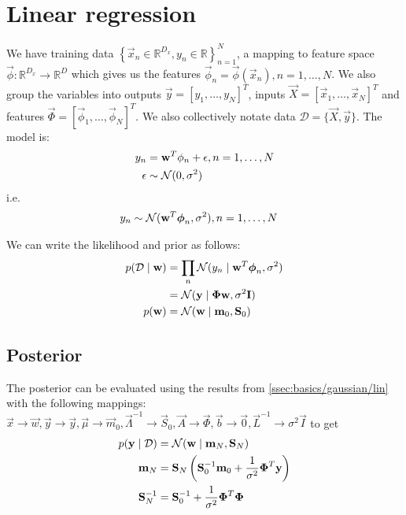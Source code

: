 \section{Linear regression}
\label{sec:models/linr}
We have training data $\left\{\vec x_n \in \mathbb R^{D_x}, y_n \in \mathbb R\right\}_{n = 1}^N$, a mapping to feature space $\vec\phi: \mathbb R^{D_x} \to \mathbb R^D$ which gives us the features $\vec \phi_n = \vec\phi(\vec x_n), n = 1, \dotsc, N$. We also group the variables into outputs $\vec y = [y_1, \dotsc, y_N]^T$, inputs $\vec X = [\vec x_1, \dotsc, \vec x_N]^T$ and features $\vec \Phi = [\vec \phi_1, \dotsc, \vec \phi_N]^T$. We also collectively notate data $\mathcal D = \{\vec X, \vec y\}$. The model is:
\begin{align}
	y_n 		&= \boldsymbol{\mathbf{w}}^T \phi_n + \epsilon, n = 1, \dotsc, N\\
	\epsilon 	&\sim \operatorname{\mathcal N}(0, \sigma^2)
\end{align}
i.e.
\begin{align}
	y_n 		&\sim \operatorname{\mathcal N}(\boldsymbol{\mathbf{w}}^T \boldsymbol{\mathbf{\phi}}_n, \sigma^2), n = 1, \dotsc, N
\end{align}

We can write the likelihood and prior as follows:
\begin{align}
	p(\mathcal D \mid \boldsymbol{\mathbf{w}})	&= \prod_n \operatorname{\mathcal N}(y_n \mid \boldsymbol{\mathbf{w}}^T \boldsymbol{\mathbf{\phi}}_n, \sigma^2) \nonumber\\
								&= \operatorname{\mathcal N}(\boldsymbol{\mathbf{y}} \mid \boldsymbol{\mathbf{\Phi}} \boldsymbol{\mathbf{w}}, \sigma^2 \boldsymbol{\mathbf{I}}) \\
	p(\boldsymbol{\mathbf{w}})					&= \operatorname{\mathcal N}(\boldsymbol{\mathbf{w}} \mid \boldsymbol{\mathbf{m}}_0, \boldsymbol{\mathbf{S}}_0)
\end{align}

\subsection{Posterior}
The posterior can be evaluated using the results from \ref{ssec:basics/gaussian/lin} with the following mappings: $\vec x \to \vec w, \vec y \to \vec y, \vec \mu \to \vec m_0, \vec \Lambda^{-1} \to \vec S_0, \vec A \to \vec \Phi, \vec b \to \vec 0, \vec L^{-1} \to \sigma^2 \vec I$ to get
\begin{align}
	p(\boldsymbol{\mathbf{y}} \mid \mathcal D)	&= \operatorname{\mathcal N}(\boldsymbol{\mathbf{w}} \mid \boldsymbol{\mathbf{m}}_N, \boldsymbol{\mathbf{S}}_N) \\
	\boldsymbol{\mathbf{m}}_N					&= \boldsymbol{\mathbf{S}}_N \left(\boldsymbol{\mathbf{S}}_0^{-1} \boldsymbol{\mathbf{m}}_0 + \frac{1}{\sigma^2} \boldsymbol{\mathbf{\Phi}}^T \boldsymbol{\mathbf{y}}\right) \\
	\boldsymbol{\mathbf{S}}_N^{-1}				&= \boldsymbol{\mathbf{S}}_0^{-1} + \frac{1}{\sigma^2} \boldsymbol{\mathbf{\Phi}}^T \boldsymbol{\mathbf{\Phi}}
\end{align}

